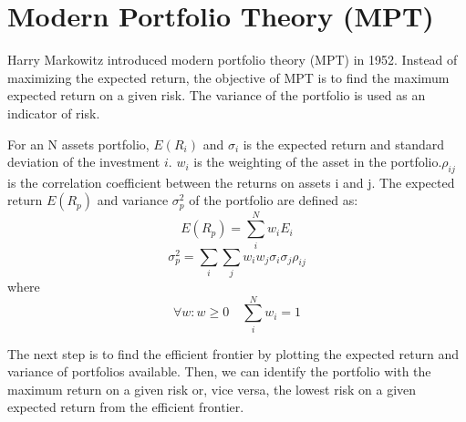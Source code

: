 \section{Modern Portfolio Theory (MPT)}
Harry Markowitz introduced modern portfolio theory (MPT) in 1952. Instead of maximizing the expected return, the objective of MPT is to find the maximum expected return on a given risk. The variance of the portfolio is used as an indicator of risk\cite{10.2307/2975974}.
\par
For an N assets portfolio, \(E(R_i)\) and  \(\sigma_i\) is the expected return and standard deviation of the investment \(i\). \(w_i\) is the weighting of the asset in the portfolio.\(\rho_{ij}\) is the correlation coefficient between the returns on assets i and j.
The expected return \(E(R_p)\) and variance \(\sigma_p^2\) of the portfolio are defined as:
\[E(R_p) = \sum_i^N w_i E_i\]
\[\sigma_p^2 = \sum_i \sum_j w_i w_j \sigma_i \sigma_j \rho_{ij}\]
where
\[\forall w: w \geq 0 \quad \sum_i ^N w_i = 1\]
\par
The next step is to find the efficient frontier by plotting the expected return and variance of portfolios available. Then, we can identify the portfolio with the maximum return on a given risk or, vice versa, the lowest risk on a given expected return from the efficient frontier.